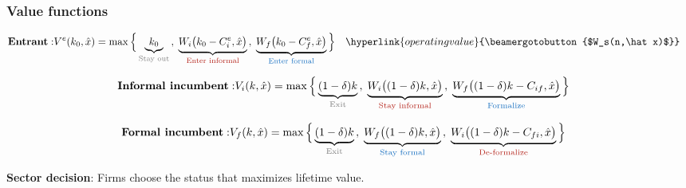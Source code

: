 \documentclass[aspectratio=169]{beamer}
\begin{document}
 
\begin{frame}\label{value_functions}
\frametitle{Value functions} \label{valuefunctions}
 
\begin{align*}
    \text{\textbf{Entrant}}: & V^{e}(k_0,\hat{x}) = \max\Big\{ \underbrace{k_0}_{\text{\textcolor{gray}{Stay out}}} \,,\; \underbrace{W_i\big(k_0 - C^{e}_{i},\hat{x}\big)}_{\text{\textcolor{BrickRed}{Enter informal}}} \,,\; \underbrace{W_f\big(k_0 - C^{e}_{f},\hat{x}\big)}_{\text{\textcolor{RoyalBlue}{Enter formal}}} \Big\} \quad \hyperlink{operatingvalue}{\beamergotobutton{$W_s(n,\hat x)$}}
\end{align*}
\pause
 
\begin{align*}
    \text{\textbf{Informal incumbent}}: & V_i(k,\hat{x}) = \max\Big\{ \underbrace{(1-\delta)k}_{\text{\textcolor{gray}{Exit}}} \,,\; \underbrace{W_i\big((1-\delta)k,\hat{x}\big)}_{\text{\textcolor{BrickRed}{Stay informal}}} \,,\; \underbrace{W_f\big((1-\delta)k - C_{if},\hat{x}\big)}_{\text{\textcolor{RoyalBlue}{Formalize}}} \Big\}
\end{align*}
\pause
 
\begin{align*}
    \text{\textbf{Formal incumbent}}: & V_f(k,\hat{x}) = \max\Big\{ \underbrace{(1-\delta)k}_{\text{\textcolor{gray}{Exit}}} \,,\; \underbrace{W_f\big((1-\delta)k,\hat{x}\big)}_{\text{\textcolor{RoyalBlue}{Stay formal}}} \,,\; \underbrace{W_i\big((1-\delta)k - C_{fi},\hat{x}\big)}_{\text{\textcolor{BrickRed}{De-formalize}}} \Big\}
\end{align*}
\pause
 
\vspace{2mm}
 
\begin{center}
    \large \textbf{Sector decision}: Firms choose the status that maximizes lifetime value.
\end{center}
 
\end{frame}
 
 
\end{document}
